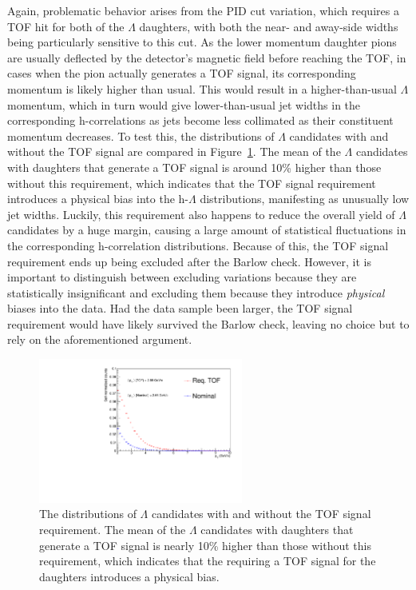 Again, problematic behavior arises from the PID cut variation, which requires a TOF hit for both of the $\Lambda$ daughters, with both the near- and away-side widths being particularly sensitive to this cut. As the lower momentum daughter pions are usually deflected by the detector's magnetic field before reaching the TOF, in cases when the pion actually generates a TOF signal, its corresponding momentum is likely higher than usual. This would result in a higher-than-usual $\Lambda$ momentum, which in turn would give lower-than-usual jet widths in the corresponding h-\lmb correlations as jets become less collimated as their constituent momentum decreases. To test this, the \pt distributions of $\Lambda$ candidates with and without the TOF signal are compared in Figure~\ref{fig:tof_momentum_bias}. The mean \pt of the $\Lambda$ candidates with daughters that generate a TOF signal is around 10\% higher than those without this requirement, which indicates that the TOF signal requirement introduces a physical bias into the h-$\Lambda$ \dphi distributions, manifesting as unusually low jet widths. Luckily, this requirement also happens to reduce the overall yield of $\Lambda$ candidates by a huge margin, causing a large amount of statistical fluctuations in the corresponding h-\lmb correlation distributions. Because of this, the TOF signal requirement ends up being excluded after the Barlow check. However, it is important to distinguish between excluding variations because they are statistically insignificant and excluding them because they introduce \textit{physical} biases into the data. Had the data sample been larger, the TOF signal requirement would have likely survived the Barlow check, leaving no choice but to rely on the aforementioned argument.

\begin{figure}[t]
    \centering
    \includegraphics[width=0.6\textwidth]{figures/analysis/quick_tof_pt_check.pdf}
    \caption{The \pt distributions of $\Lambda$ candidates with and without the TOF signal requirement. The mean \pt of the $\Lambda$ candidates with daughters that generate a TOF signal is nearly 10\% higher than those without this requirement, which indicates that the requiring a TOF signal for the \lmb daughters introduces a physical bias.}
    \label{fig:tof_momentum_bias}
\end{figure}


